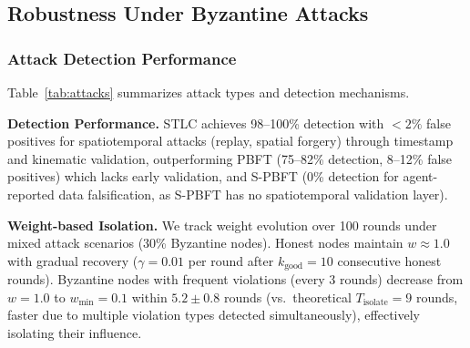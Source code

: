 \documentclass[manuscript,screen,review]{acmart}
\begin{document}
\subsection{Robustness Under Byzantine Attacks}
\label{sec:robustness}

\subsubsection{Attack Detection Performance}
\label{sec:attack_detection}

Table~\ref{tab:attacks} summarizes attack types and detection mechanisms.

\begin{table}[h]
\centering
\caption{Byzantine Attack Detection Performance}
\label{tab:attacks}
\small
{}
\end{table}

\textbf{Detection Performance.} STLC achieves 98--100\% detection with $<2\%$ false positives for spatiotemporal attacks (replay, spatial forgery) through timestamp and kinematic validation, outperforming PBFT (75--82\% detection, 8--12\% false positives) which lacks early validation, and S-PBFT (0\% detection for agent-reported data falsification, as S-PBFT has no spatiotemporal validation layer).

\textbf{Weight-based Isolation.} We track weight evolution over 100 rounds under mixed attack scenarios (30\% Byzantine nodes). Honest nodes maintain $w \approx 1.0$ with gradual recovery ($\gamma = 0.01$ per round after $k_{\text{good}} = 10$ consecutive honest rounds). Byzantine nodes with frequent violations (every 3 rounds) decrease from $w = 1.0$ to $w_{\min} = 0.1$ within $5.2 \pm 0.8$ rounds (vs.\ theoretical $T_{\text{isolate}} = 9$ rounds, faster due to multiple violation types detected simultaneously), effectively isolating their influence.
\end{document}
